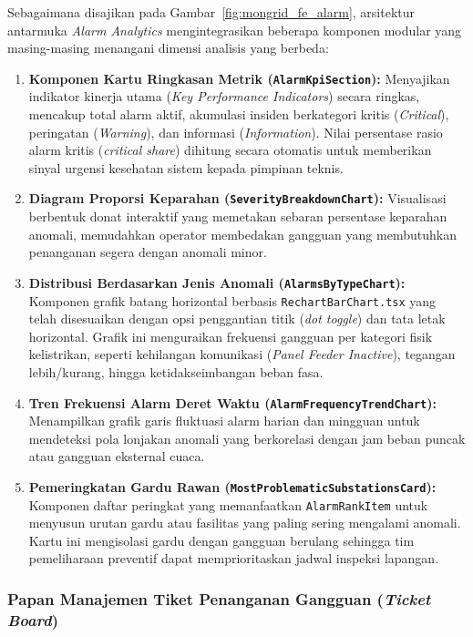 Sebagaimana disajikan pada Gambar~\ref{fig:mongrid_fe_alarm}, arsitektur antarmuka \textit{Alarm Analytics} mengintegrasikan beberapa komponen modular yang masing-masing menangani dimensi analisis yang berbeda:
\begin{enumerate}[label=\arabic*., leftmargin=*, itemsep=0pt]
  \item \textbf{Komponen Kartu Ringkasan Metrik (\texttt{AlarmKpiSection}):} Menyajikan indikator kinerja utama (\textit{Key Performance Indicators}) secara ringkas, mencakup total alarm aktif, akumulasi insiden berkategori kritis (\textit{Critical}), peringatan (\textit{Warning}), dan informasi (\textit{Information}). Nilai persentase rasio alarm kritis (\textit{critical share}) dihitung secara otomatis untuk memberikan sinyal urgensi kesehatan sistem kepada pimpinan teknis.
  \item \textbf{Diagram Proporsi Keparahan (\texttt{SeverityBreakdownChart}):} Visualisasi berbentuk donat interaktif yang memetakan sebaran persentase keparahan anomali, memudahkan operator membedakan gangguan yang membutuhkan penanganan segera dengan anomali minor.
  \item \textbf{Distribusi Berdasarkan Jenis Anomali (\texttt{AlarmsByTypeChart}):} Komponen grafik batang horizontal berbasis \texttt{RechartBarChart.tsx} yang telah disesuaikan dengan opsi penggantian titik (\textit{dot toggle}) dan tata letak horizontal. Grafik ini menguraikan frekuensi gangguan per kategori fisik kelistrikan, seperti kehilangan komunikasi (\textit{Panel Feeder Inactive}), tegangan lebih/kurang, hingga ketidakseimbangan beban fasa.
  \item \textbf{Tren Frekuensi Alarm Deret Waktu (\texttt{AlarmFrequencyTrendChart}):} Menampilkan grafik garis fluktuasi alarm harian dan mingguan untuk mendeteksi pola lonjakan anomali yang berkorelasi dengan jam beban puncak atau gangguan eksternal cuaca.
  \item \textbf{Pemeringkatan Gardu Rawan (\texttt{MostProblematicSubstationsCard}):} Komponen daftar peringkat yang memanfaatkan \texttt{AlarmRankItem} untuk menyusun urutan gardu atau fasilitas yang paling sering mengalami anomali. Kartu ini mengisolasi gardu dengan gangguan berulang sehingga tim pemeliharaan preventif dapat memprioritaskan jadwal inspeksi lapangan.
\end{enumerate}

\subsubsection{Papan Manajemen Tiket Penanganan Gangguan (\textit{Ticket Board})}

